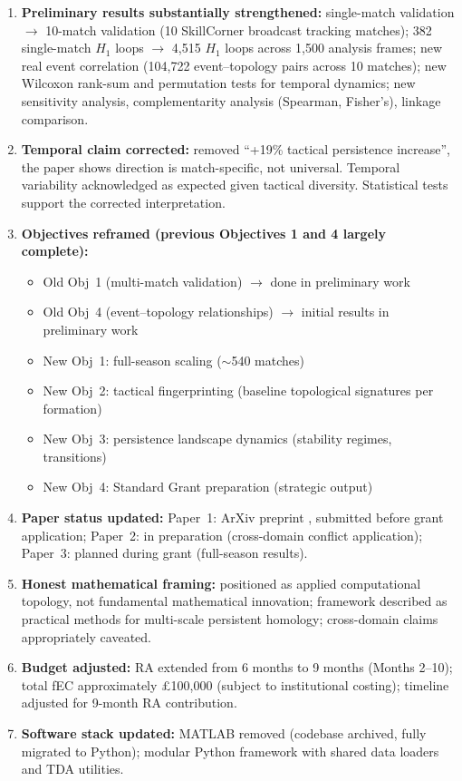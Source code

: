 \begin{enumerate}[label=\arabic*.]
  \item \textbf{Preliminary results substantially strengthened:} single-match validation $\rightarrow$ 10-match validation (10 SkillCorner broadcast tracking matches); 382 single-match $H_1$ loops $\rightarrow$ 4{,}515 $H_1$ loops across 1{,}500 analysis frames; new real event correlation (104{,}722 event--topology pairs across 10 matches); new Wilcoxon rank-sum and permutation tests for temporal dynamics; new sensitivity analysis, complementarity analysis (Spearman, Fisher's), linkage comparison.

  \item \textbf{Temporal claim corrected:} removed ``+19\% tactical persistence increase'', the paper shows direction is match-specific, not universal. Temporal variability acknowledged as expected given tactical diversity. Statistical tests support the corrected interpretation.

  \item \textbf{Objectives reframed (previous Objectives 1 and 4 largely complete):}
    \begin{itemize}
      \item Old Obj~1 (multi-match validation) $\rightarrow$ done in preliminary work
      \item Old Obj~4 (event--topology relationships) $\rightarrow$ initial results in preliminary work
      \item New Obj~1: full-season scaling ($\sim$540 matches)
      \item New Obj~2: tactical fingerprinting (baseline topological signatures per formation)
      \item New Obj~3: persistence landscape dynamics (stability regimes, transitions)
      \item New Obj~4: Standard Grant preparation (strategic output)
    \end{itemize}

  \item \textbf{Paper status updated:} Paper~1: ArXiv preprint \citep{Brown2026}, submitted before grant application; Paper~2: in preparation (cross-domain conflict application); Paper~3: planned during grant (full-season results).

  \item \textbf{Honest mathematical framing:} positioned as applied computational topology, not fundamental mathematical innovation; framework described as practical methods for multi-scale persistent homology; cross-domain claims appropriately caveated.

  \item \textbf{Budget adjusted:} RA extended from 6 months to 9 months (Months 2--10); total fEC approximately \pounds100{,}000 (subject to institutional costing); timeline adjusted for 9-month RA contribution.

  \item \textbf{Software stack updated:} MATLAB removed (codebase archived, fully migrated to Python); modular Python framework with shared data loaders and TDA utilities.
\end{enumerate}


